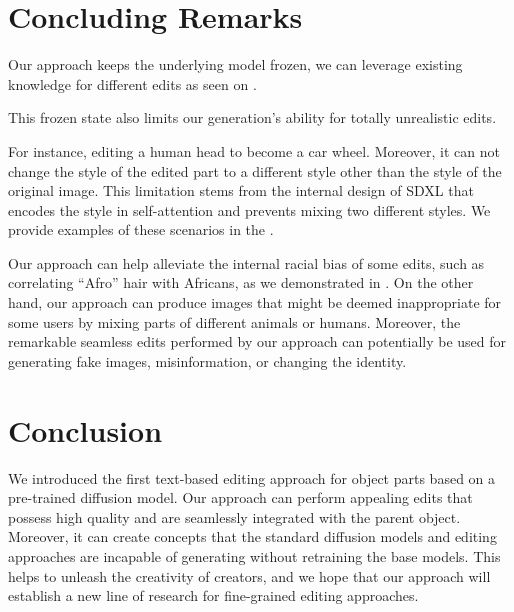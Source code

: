 


\section{Concluding Remarks}
\label{sec:conclusion}
Our approach keeps the underlying model frozen, we can leverage existing knowledge for different edits as seen on .


This frozen state also limits our generation's ability for totally unrealistic edits. 

For instance, editing a human head to become a car wheel. 
Moreover, it can not change the style of the edited part to a different style other than the style of the original image.
This limitation stems from the internal design of SDXL that encodes the style in self-attention and prevents mixing two different styles. 
We provide examples of these scenarios in the . %

Our approach can help alleviate the internal racial bias of some edits, such as correlating ``Afro'' hair with Africans, as we demonstrated in .
On the other hand, our approach can produce images that might be deemed inappropriate for some users by mixing parts of different animals or humans. 
Moreover, the remarkable seamless edits performed by our approach can potentially be used for generating fake images, misinformation, or changing the identity.



\section{Conclusion}
We introduced the first text-based editing approach for object parts based on a pre-trained diffusion model.
Our approach can perform appealing edits that possess high quality and are seamlessly integrated with the parent object.
Moreover, it can create concepts that the standard diffusion models and editing approaches are incapable of generating without retraining the base models.
This helps to unleash the creativity of creators, and we hope that our approach will establish a new line of research for fine-grained editing approaches.


